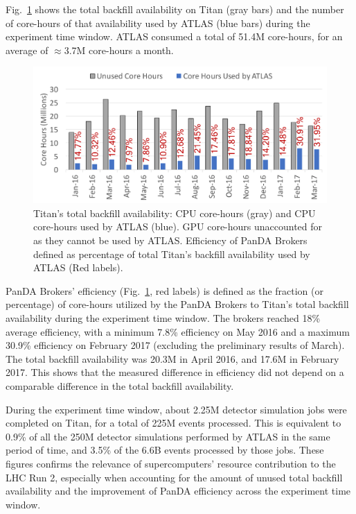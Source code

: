 Fig.~\ref{fig:backfill-utilization} shows the total backfill availability on
Titan (gray bars) and the number of core-hours of that availability used by
ATLAS (blue bars) during the experiment time window. ATLAS consumed a total
of 51.4M core-hours, for an average of \(\approx\)3.7M core-hours a month.

\begin{figure}[!t]
    \includegraphics[clip,width=\columnwidth]{figures/backfill_consumption.pdf}
    \vspace{-0.3in}
    \caption{Titan's total backfill availability: CPU core-hours (gray) and
    CPU core-hours used by ATLAS (blue). GPU core-hours unaccounted for as
    they cannot be used by ATLAS\@. Efficiency of PanDA Brokers defined as
    percentage of total Titan's backfill availability used by ATLAS (Red
    labels).}\label{fig:backfill-utilization}
\end{figure}

PanDA Brokers' efficiency (Fig.~\ref{fig:backfill-utilization}, red labels)
is defined as the fraction (or percentage) of core-hours utilized by the
PanDA Brokers to Titan’s total backfill availability during the experiment
time window. The brokers reached 18\% average efficiency, with a minimum
7.8\% efficiency on May 2016 and a maximum 30.9\% efficiency on February 2017
(excluding the preliminary results of March). The total backfill availability
was 20.3M in April 2016, and 17.6M in February 2017. This shows that the
measured difference in efficiency did not depend on a comparable difference
in the total backfill availability.

During the experiment time window, about 2.25M detector simulation jobs were
completed on Titan, for a total of 225M events processed. This is equivalent
to 0.9\% of all the 250M detector simulations performed by ATLAS in the same
period of time, and 3.5\% of the 6.6B events processed by those jobs. These
figures confirms the relevance of supercomputers' resource contribution to
the LHC Run 2, especially when accounting for the amount of unused total
backfill availability and the improvement of PanDA efficiency across the
experiment time window.

